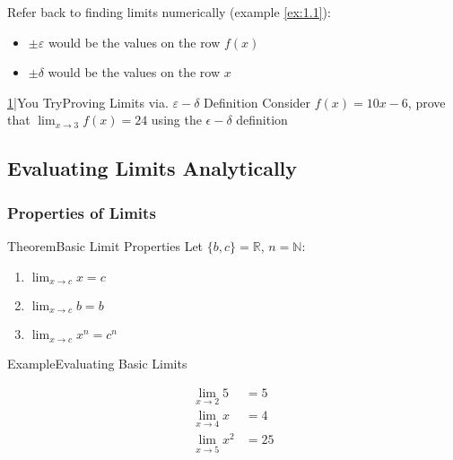 \documentclass{MathNotes}
\newenvironment{example}[1]{\begin{BlueBox}{Example}{#1}}{\end{BlueBox}}
\newenvironment{theorem}[1]{\begin{GrayBox}{Theorem}{#1}}{\end{GrayBox}}
\newenvironment{practice}[2]{\begin{PurpleBox}{\texorpdfstring{#1}\Big|You Try}{#2}}{\end{PurpleBox}}
\begin{document}
Refer back to finding limits numerically (example \ref{ex:1.1}):
\begin{itemize}
    \item $\pm\varepsilon$ would be the values on the row $f(x)$
    \item $\pm\delta$ would be the values on the row $x$
\end{itemize}


\begin{practice}{\hyperref[ans:1.1.2-1]{1}}{Proving Limits via. $\varepsilon-\delta$ Definition}
    \label{prac:1.1.2-1}
    Consider $f(x)=10x-6$, prove that $\displaystyle\lim_{x\to 3}f(x)=24$ using the 
    $\epsilon-\delta$ definition
\end{practice}

\subsection{Evaluating Limits Analytically}

\subsubsection{Properties of Limits}

\begin{multicols}{2}[]
    \begin{theorem}{Basic Limit Properties}
        Let $\{b, c\}=\mathbb{R}$, $n=\mathbb{N}$:

        \begin{enumerate}
            \item $\lim_{x\to c}x=c$ 
            \item $\lim_{x\to c}b=b$ 
            \item $\lim_{x\to c}x^n=c^n$
        \end{enumerate}
    \end{theorem}

    \begin{example}{Evaluating Basic Limits}
        \begin{center}
            \begin{align*}
                \lim_{x\to 2}5&=5 \\  
                \lim_{x\to 4}x&=4 \\
                \lim_{x\to 5}x^2&=25
            \end{align*}
        \end{center}
    \end{example}
\end{multicols}
\end{document}
